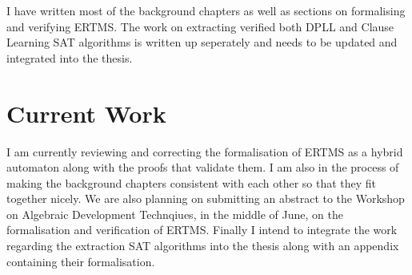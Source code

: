 \documentclass{article}
\begin{document}
I have written most of the background chapters as well as sections on formalising and verifying ERTMS. The work on extracting verified both DPLL and Clause Learning SAT algorithms is written up seperately and needs to be updated and integrated into the thesis.

\section{Current Work}
I am currently reviewing and correcting the formalisation of ERTMS as a hybrid automaton along with the proofs that validate them. I am also in the process of making the background chapters consistent with each other so that they fit together nicely. We are also planning on submitting an abstract to the Workshop on Algebraic Development Technqiues, in the middle of June, on the formalisation and verification of ERTMS. Finally I intend to integrate the work regarding the extraction SAT algorithms into the thesis along with an appendix containing their formalisation.
 
\end{document}
